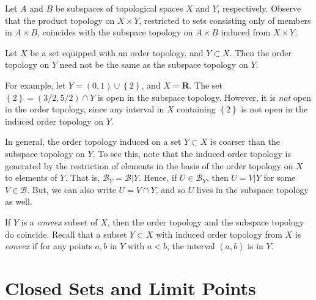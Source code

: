 \begin{remark}
Let $A$ and $B$ be subspaces of topological spaces $X$ and $Y$, respectively.
Observe that the product topology on $X \times Y$, restricted to sets consisting only
of members in $A \times B$, coincides with the subspace topology
on $A \times B$ induced from $X \times Y$.
\end{remark}
\begin{remark}
Let $X$ be a set equipped with an order topology, and $Y \subset X$.
Then the order topology on $Y$ need not be the same as the subspace topology on $Y$.
\par
For example, let $Y = (0,1) \cup \left\{ 2 \right\}$, and $X = \mathbf{R}$. The set $\left\{ 2 \right\} = (3/2, 5/2) \cap Y$ is open in the subspace
topology. However, it is \emph{not} open in the order topology, since any
interval in $X$ containing $\left\{2\right\}$ is not open in the induced order
topology on $Y$.
\par
In general, the order topology induced on a set $Y \subset X$ is coarser than the
subspace topology on $Y$. To see this, note that the induced order topology is
generated by the restriction of elements in the basis of the order
topology on $X$ to elements of $Y$. That is,
$\mathcal{B}_{Y} = \mathcal{B}| Y$. Hence, if $U \in \mathcal{B}_{Y}$, then
$U = V | Y$ for some $V \in \mathcal{B}$. But, we can also write $U = V \cap Y$,
and so $U$ lives in the subspace topology as well.
\par
If $Y$ is a \emph{convex} subset of $X$, then the order topology and the subspace
topology do coincide. Recall that a subset $Y \subset X$ with induced order
topology from $X$ is \emph{convex} if for any points $a,b$ in $Y$ with $a < b$,
the interval $(a,b)$ is in $Y$.
\end{remark}
\section{Closed Sets and Limit Points}
